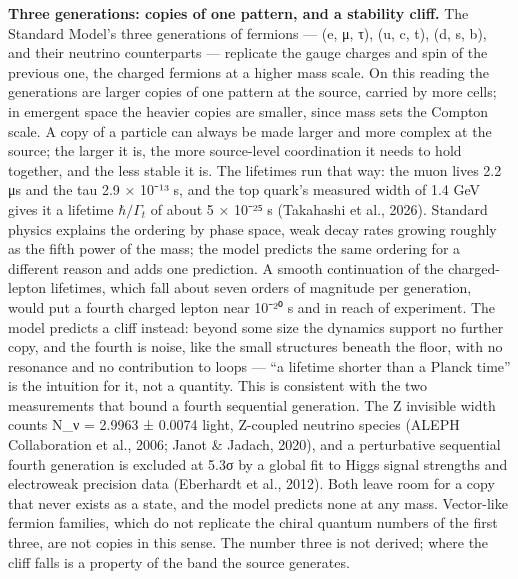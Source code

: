 \documentclass[
]{article}
\begin{document}
\textbf{Three generations: copies of one pattern, and a stability
cliff.} The Standard Model's three generations of fermions --- (e, μ,
τ), (u, c, t), (d, s, b), and their neutrino counterparts --- replicate
the gauge charges and spin of the previous one, the charged fermions at
a higher mass scale. On this reading the generations are larger copies
of one pattern at the source, carried by more cells; in emergent space
the heavier copies are smaller, since mass sets the Compton scale. A
copy of a particle can always be made larger and more complex at the
source; the larger it is, the more source-level coordination it needs to
hold together, and the less stable it is. The lifetimes run that way:
the muon lives 2.2 μs and the tau 2.9 × 10⁻¹³ s, and the top quark's
measured width of 1.4 GeV gives it a lifetime \(\hbar/\Gamma_t\) of
about 5 × 10⁻²⁵ s (Takahashi et al., 2026). Standard physics explains
the ordering by phase space, weak decay rates growing roughly as the
fifth power of the mass; the model predicts the same ordering for a
different reason and adds one prediction. A smooth continuation of the
charged-lepton lifetimes, which fall about seven orders of magnitude per
generation, would put a fourth charged lepton near 10⁻²⁰ s and in reach
of experiment. The model predicts a cliff instead: beyond some size the
dynamics support no further copy, and the fourth is noise, like the
small structures beneath the floor, with no resonance and no
contribution to loops --- ``a lifetime shorter than a Planck time'' is
the intuition for it, not a quantity. This is consistent with the two
measurements that bound a fourth sequential generation. The Z invisible
width counts N\_ν = 2.9963 ± 0.0074 light, Z-coupled neutrino species
(ALEPH Collaboration et al., 2006; Janot \& Jadach, 2020), and a
perturbative sequential fourth generation is excluded at 5.3σ by a
global fit to Higgs signal strengths and electroweak precision data
(Eberhardt et al., 2012). Both leave room for a copy that never exists
as a state, and the model predicts none at any mass. Vector-like fermion
families, which do not replicate the chiral quantum numbers of the first
three, are not copies in this sense. The number three is not derived;
where the cliff falls is a property of the band the source generates.
\end{document}
